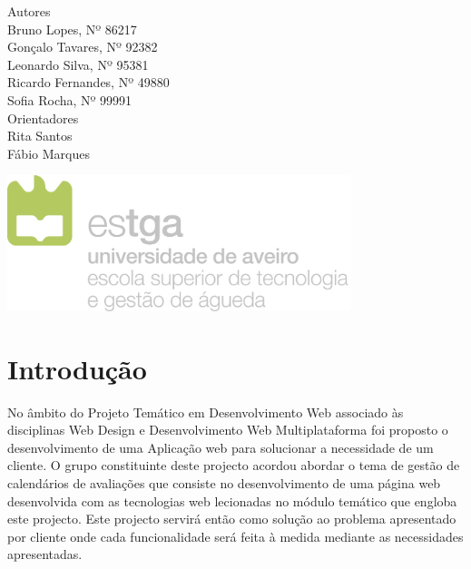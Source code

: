 \documentclass[11pt, twoside]{report}
\begin{document}
\begin{titlepage}
		
		
		\large
		Autores\\
		Bruno Lopes, Nº 86217 \\
		Gonçalo Tavares, Nº 92382  \\
		Leonardo Silva, Nº 95381 \\
		Ricardo Fernandes, Nº 49880  \\
		Sofia Rocha, Nº 99991 \\
		
		\vspace{1cm}
		Orientadores\\
		Rita Santos \\
		Fábio Marques\\
		\vspace{4cm}
		
		\centering
		\includegraphics[width=10cm]{image/AssB_vertical_cor}
		
	\end{titlepage}
	
	\newpage
	\setcounter{page}{1} %
	\tableofcontents %
	\thispagestyle{plain} %
	\thispagestyle{empty} %
	\newpage
	\listoftables %
	\newpage
	\listoffigures %
	
	\newpage
	
	\chapter{Introdução}
	
	No âmbito do Projeto Temático em Desenvolvimento Web associado às disciplinas Web Design e Desenvolvimento Web Multiplataforma foi proposto o desenvolvimento de uma Aplicação web para solucionar a necessidade de um cliente. 
	O grupo constituinte deste projecto acordou abordar o tema de gestão de calendários de avaliações que consiste no desenvolvimento de uma página web desenvolvida com as tecnologias web lecionadas no módulo temático que engloba este projecto.
	Este projecto servirá então como solução ao problema apresentado por cliente onde cada funcionalidade será feita à medida mediante as necessidades apresentadas.
	
\end{document}
